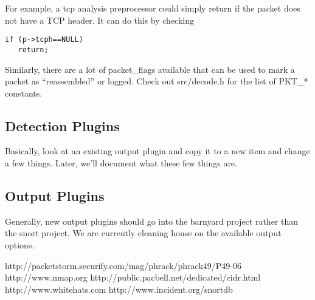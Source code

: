 \documentclass[english]{report}
\begin{document}
For example, a tcp analysis preprocessor could simply return if the
packet does not have a TCP header. It can do this by checking 

\begin{verbatim}
if (p->tcph==NULL)
   return;
\end{verbatim}
Similarly, there are a lot of packet\_flags available that can be
used to mark a packet as ``reassembled'' or logged. Check out src/decode.h
for the list of PKT\_{*} constants.


\subsection{Detection Plugins}
Basically, look at an existing output plugin and copy it to a new item
and change a few things. Later, we'll document what these few things are.

\subsection{Output Plugins}
Generally, new output plugins should go into the barnyard project
rather than the snort project. We are currently cleaning house on the
available output options.

\appendix

\begin{thebibliography}{99}
http://packetstorm.securify.com/mag/phrack/phrack49/P49-06
http://www.nmap.org
http://public.pacbell.net/dedicated/cidr.html
http://www.whitehats.com
http://www.incident.org/snortdb
\end{thebibliography}
\end{document}
